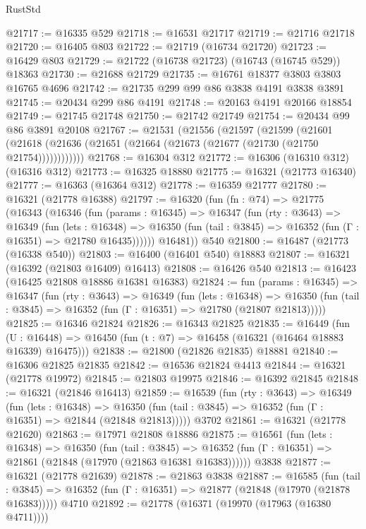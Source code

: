 \begin{lexlean}{RustStd}
\begin{coremodule}
@21717 := @16335 @529
@21718 := @16531 @21717
@21719 := @21716 @21718
@21720 := @16405 @803
@21722 := @21719 (@16734 @21720)
@21723 := @16429 @803
@21729 := @21722 (@16738 @21723) (@16743 (@16745 @529)) @18363
@21730 := @21688 @21729
@21735 := @16761 @18377 @3803 @3803 @16765 @4696
@21742 := @21735 @299 @99 @86 @3838 @4191 @3838 @3891
@21745 := @20434 @299 @86 @4191
@21748 := @20163 @4191 @20166 @18854
@21749 := @21745 @21748
@21750 := @21742 @21749
@21754 := @20434 @99 @86 @3891 @20108
@21767 := @21531
    (@21556
      (@21597
        (@21599
          (@21601 (@21618 (@21636 (@21651 (@21664 (@21673 (@21677 (@21730 (@21750 @21754))))))))))))
@21768 := @16304 @312
@21772 := @16306 (@16310 @312) (@16316 @312)
@21773 := @16325 @18880
@21775 := @16321 (@21773 @16340)
@21777 := @16363 (@16364 @312)
@21778 := @16359 @21777
@21780 := @16321 (@21778 @16388)
@21797 := @16320
    (fun (fn : @74) =>
    @21775
      (@16343
        (@16346
          (fun (params : @16345) =>
          @16347
            (fun (rty : @3643) =>
            @16349
              (fun (lets : @16348) =>
              @16350 (fun (tail : @3845) => @16352 (fun (Γ : @16351) => @21780 @16435))))))
        @16481))
    @540
@21800 := @16487 (@21773 (@16338 @540))
@21803 := @16400 (@16401 @540) @18883
@21807 := @16321 (@16392 (@21803 @16409) @16413)
@21808 := @16426 @540
@21813 := @16423 (@16425 @21808 @18886 @16381 @16383)
@21824 := fun (params : @16345) =>
  @16347
    (fun (rty : @3643) =>
    @16349
      (fun (lets : @16348) =>
      @16350 (fun (tail : @3845) => @16352 (fun (Γ : @16351) => @21780 (@21807 @21813)))))
@21825 := @16346 @21824
@21826 := @16343 @21825
@21835 := @16449
    (fun (U : @16448) => @16450 (fun (t : @7) => @16458 (@16321 (@16464 @18883 @16339) @16475)))
@21838 := @21800 (@21826 @21835) @18881
@21840 := @16306 @21825 @21835
@21842 := @16536 @21824 @4413
@21844 := @16321 (@21778 @19972)
@21845 := @21803 @19975
@21846 := @16392 @21845
@21848 := @16321 (@21846 @16413)
@21859 := @16539
    (fun (rty : @3643) =>
    @16349
      (fun (lets : @16348) =>
      @16350 (fun (tail : @3845) => @16352 (fun (Γ : @16351) => @21844 (@21848 @21813)))))
    @3702
@21861 := @16321 (@21778 @21620)
@21863 := @17971 @21808 @18886
@21875 := @16561
    (fun (lets : @16348) =>
    @16350
      (fun (tail : @3845) =>
      @16352 (fun (Γ : @16351) => @21861 (@21848 (@17970 (@21863 @16381 @16383))))))
    @3838
@21877 := @16321 (@21778 @21639)
@21878 := @21863 @3838
@21887 := @16585
    (fun (tail : @3845) => @16352 (fun (Γ : @16351) => @21877 (@21848 (@17970 (@21878 @16383)))))
    @4710
@21892 := @21778 (@16371 (@19970 (@17963 (@16380 @4711))))

\end{coremodule}
\end{lexlean}
